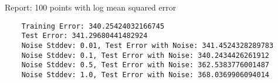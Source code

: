\documentclass[a4paper]{article}
\theoremstyle{definition}
\newenvironment{soln}{
    \leavevmode\color{blue}\ignorespaces
}{}
\begin{document}
\begin{soln}
  Report: 100 points with log mean squared error\\
  \begin{verbatim}
    Training Error: 340.25424032166745
    Test Error: 341.29680441482924
    Noise Stddev: 0.01, Test Error with Noise: 341.4524328289783
    Noise Stddev: 0.1, Test Error with Noise: 340.2434426261912
    Noise Stddev: 0.5, Test Error with Noise: 362.5383776001487
    Noise Stddev: 1.0, Test Error with Noise: 368.0369906094014
    
  \end{verbatim}


\end{soln}


\end{document}
